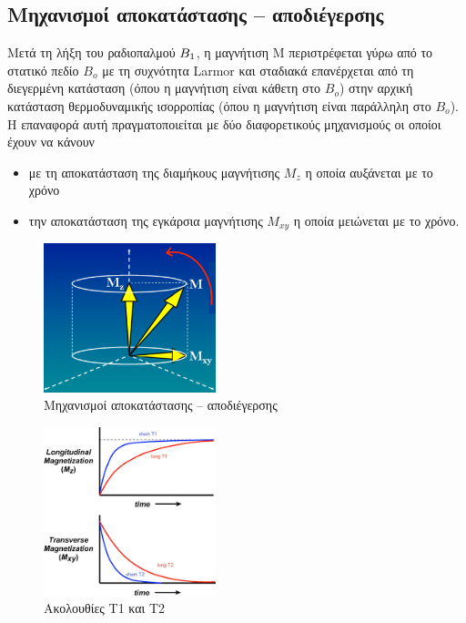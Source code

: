 \documentclass{article}
\begin{document}
\subsection{Μηχανισμοί	αποκατάστασης	–	αποδιέγερσης}
Μετά	 τη	 λήξη	 του	 ραδιοπαλμού	 $B_{1}\\
$,	 η	 μαγνήτιση	 Μ	 περιστρέφεται	
γύρω	από	το	στατικό	πεδίο	$Β_{ο}$	με	τη	συχνότητα	Larmor	και	σταδιακά	
επανέρχεται	από	τη	διεγερμένη	κατάσταση	(όπου	η	μαγνήτιση	είναι	
κάθετη	στο	$Β_{ο}$)	στην	αρχική	κατάσταση	θερμοδυναμικής	ισορροπίας	
(όπου	η	μαγνήτιση	είναι	παράλληλη	στο	$Β_{ο}$).
 Η	 επαναφορά	 αυτή	 πραγματοποιείται	 με	
δύο	 διαφορετικούς	 μηχανισμούς	 οι	 οποίοι	
έχουν	να	κάνουν
\begin{itemize}
    \item με	τη	αποκατάσταση	της	διαμήκους	
μαγνήτισης	$M_z$	η	οποία	αυξάνεται	με	το	
χρόνο
    \item την	αποκατάσταση	της	εγκάρσια	
μαγνήτισης	$Μ_{xy}$	η	οποία	μειώνεται	με	το	
χρόνο.		
\end{itemize}
\begin{figure}[h!]	
     \centering
     
  \includegraphics[width=50mm,scale=0.4]{mxy.png}
  \caption{Μηχανισμοί	αποκατάστασης	–	αποδιέγερσης}
\end{figure}
\begin{figure}[h!]	
     \centering
     
  \includegraphics[width=50mm,scale=0.4]{mxyz.png}
  \caption{Ακολουθίες T1 και Τ2}
\end{figure}
\clearpage
\end{document}
